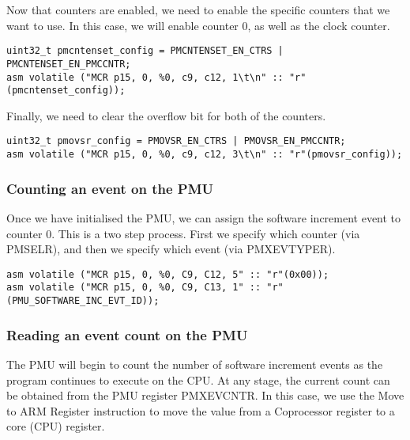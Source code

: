 {Now that counters are enabled, we need to enable the specific counters that we want to use. In this case, we will enable counter 0, as well as the clock counter.

\begin{listing}
    \begin{verbatim}
uint32_t pmcntenset_config = PMCNTENSET_EN_CTRS | PMCNTENSET_EN_PMCCNTR;
asm volatile ("MCR p15, 0, %0, c9, c12, 1\t\n" :: "r"(pmcntenset_config));
    \end{verbatim}
\end{listing}

Finally, we need to clear the overflow bit for both of the counters.

\begin{listing}
    \begin{verbatim}
uint32_t pmovsr_config = PMOVSR_EN_CTRS | PMOVSR_EN_PMCCNTR;
asm volatile ("MCR p15, 0, %0, c9, c12, 3\t\n" :: "r"(pmovsr_config));
    \end{verbatim}
\end{listing}

\subsubsection{Counting an event on the PMU}

Once we have initialised the PMU, we can assign the software increment event to counter 0. This is a two step process. First we specify which counter (via PMSELR), and then we specify which event (via PMXEVTYPER).

\begin{listing}
    \begin{verbatim}
asm volatile ("MCR p15, 0, %0, C9, C12, 5" :: "r"(0x00));
asm volatile ("MCR p15, 0, %0, C9, C13, 1" :: "r"(PMU_SOFTWARE_INC_EVT_ID));
    \end{verbatim}
\end{listing}

\subsubsection{Reading an event count on the PMU}

The PMU will begin to count the number of software increment events as the program continues to execute on the CPU. At any stage, the current count can be obtained from the PMU register PMXEVCNTR. In this case, we use the Move to ARM Register \cite{DocsArmMRC} instruction to move the value from a Coprocessor register to a core (CPU) register.

}
